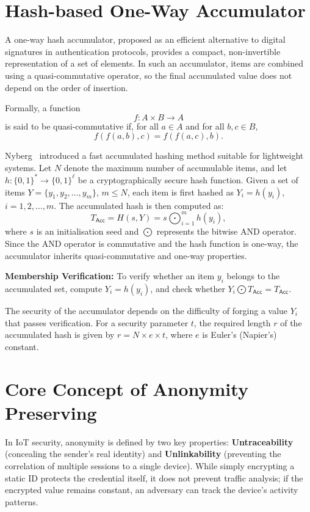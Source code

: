\section{Hash-based One-Way Accumulator}

A one-way hash accumulator, proposed as an efficient alternative to digital
signatures in authentication protocols, provides a compact, non-invertible
representation of a set of elements.
In such an accumulator, items are combined using a quasi-commutative operator,
so the final accumulated value does not depend on the order of insertion.

Formally, a function
\[
  f : A \times B \to A
\]
is said to be quasi-commutative if, for all $a \in A$ and for all $b, c \in B$,
\begin{equation}
  f(f(a,b),c) = f(f(a,c),b).
\end{equation}

Nyberg~\cite{nyberg1996acc} introduced a fast accumulated hashing method suitable
for lightweight systems.
Let $N$ denote the maximum number of accumulable items, and let
$h : \{0,1\}^* \to \{0,1\}^\ell$ be a cryptographically secure hash function.
Given a set of items $Y = \{y_1, y_2, \ldots, y_m\}$, $m \le N$, each item is
first hashed as $Y_i = h(y_i)$, $i = 1, 2, \ldots, m$.
The accumulated hash is then computed as:
\begin{equation}
  T_{\mathsf{Acc}} = H(s, Y) = s \bigodot_{i=1}^{m} h(y_i),
\end{equation}
where $s$ is an initialisation seed and $\bigodot$ represents the bitwise AND
operator.
Since the AND operator is commutative and the hash function is one-way, the
accumulator inherits quasi-commutative and one-way properties.

\textbf{Membership Verification:} To verify whether an item $y_i$ belongs to the
accumulated set, compute $Y_i = h(y_i)$, and check whether
$Y_i \bigodot T_{\mathsf{Acc}} = T_{\mathsf{Acc}}$.

The security of the accumulator depends on the difficulty of forging a value $Y_i$
that passes verification.
For a security parameter $t$, the required length $r$ of the accumulated hash is
given by $r = N \times e \times t$, where $e$ is Euler's (Napier's) constant.

\section{Core Concept of Anonymity Preserving}

In IoT security, anonymity is defined by two key properties:
\textbf{Untraceability} (concealing the sender's real identity) and
\textbf{Unlinkability} (preventing the correlation of multiple sessions to a single
device).
While simply encrypting a static ID protects the credential itself, it does not
prevent traffic analysis; if the encrypted value remains constant, an adversary can
track the device's activity patterns.

